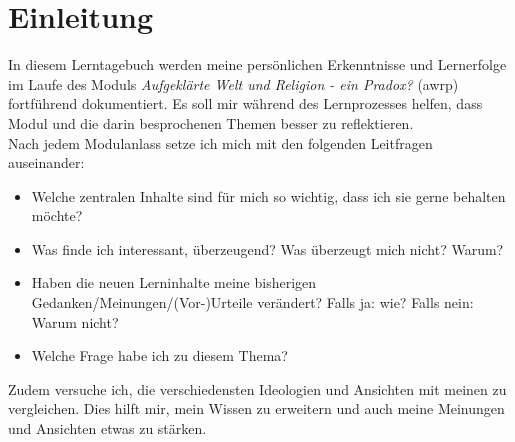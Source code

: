\section*{Einleitung}
In diesem Lerntagebuch werden meine persönlichen Erkenntnisse und Lernerfolge im Laufe des Moduls \textit{Aufgeklärte Welt und Religion - ein Pradox?} (awrp) fortführend dokumentiert. Es soll mir während des Lernprozesses helfen, dass Modul und die darin besprochenen Themen besser zu reflektieren. \\

Nach jedem Modulanlass setze ich mich mit den folgenden Leitfragen auseinander:\\
\begin{itemize}
\item Welche zentralen Inhalte sind für mich so wichtig, dass ich sie gerne behalten möchte?\\
\item Was finde ich interessant, überzeugend? Was überzeugt mich nicht? Warum?\\
\item Haben die neuen Lerninhalte meine bisherigen Gedanken/Meinungen/(Vor-)Urteile verändert? Falls ja: wie? Falls nein: Warum nicht?\\
\item Welche Frage habe ich zu diesem Thema?\\
\end{itemize}

Zudem versuche ich, die verschiedensten Ideologien und Ansichten mit meinen zu vergleichen. Dies hilft mir, mein Wissen zu erweitern und auch meine Meinungen und Ansichten etwas zu stärken.\\